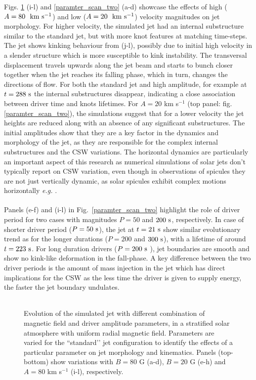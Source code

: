 \documentclass[12pt]{ociamthesis}
\newcommand{\fref}[1]{fig. \ref{#1}}
\newcommand{\kms}{~\rm{km ~s^{-1}}}
\newcommand{\np}{\\ \\}
\begin{document}
Figs. \ref{paramter_scan_one} (i-l) and \ref{paramter_scan_two} (a-d) showcase the effects of high ($A = 80 ~\kms$) and low ($A = 20 ~\kms$) velocity magnitudes on jet morphology. For higher velocity, the simulated jet had an internal substructure similar to the standard jet, but with more knot features at matching time-steps. The jet shows kinking behaviour from (j-l), possibly due to initial high velocity in a slender structure which is more susceptible to kink instability. The transversal displacement travels upwards along the jet beam and starts to bunch closer together when the jet reaches its falling phase, which in turn, changes the directions of flow. For both the standard jet and high amplitude, for example at $t = 288 ~\rm{s}$ the internal substructures disappear, indicating a close association between driver time and knots lifetimes. For $A = 20$ km s$^{-1}$ (top panel: \fref{paramter_scan_two}), the simulations suggest that for a lower velocity the jet heights are reduced along with an absence of any significant substructures. The initial amplitudes show that they are a key factor in the dynamics and morphology of the jet, as they are responsible for the complex internal substructures and the CSW variations. The horizontal dynamics are particularly an important aspect of this research as numerical simulations of solar jets don't typically report on CSW variation, even though in observations of spicules they are not just vertically dynamic, as solar spicules exhibit complex motions horizontally \textit{e.g.} \citep{Sharma2018ApJ85361S,Antolin2018ApJ85644A}. \np
%
Panels (e-f) and (i-l) in Fig.~\ref{paramter_scan_two} highlight the role of driver period for two cases with magnitudes $P = 50$ and $200~\rm{s}$, respectively. In case of shorter driver period ($P = 50 ~\rm{s}$), the jet at $t = 21~\rm{s}$ show similar evolutionary trend as for the longer durations ($P = 200$ and $300~\rm{s}$), with a lifetime of around $t = 223~\rm{s}$. For long duration drivers ($P = 200~\rm{s}$ ), jet boundaries are smooth and show no kink-like deformation in the fall-phase. A key difference between the two driver periods is the amount of mass injection in the jet which has direct implications for the CSW as the less time the driver is given to supply energy, the faster the jet boundary undulates. \np
\begin{figure}
\captionsetup[subfigure]{labelformat=empty}
\centering
{}
\caption{Evolution of the simulated jet with different combination of magnetic field and driver amplitude parameters, in a stratified solar atmosphere with uniform radial magnetic field. Parameters are varied for the ``standard’’ jet configuration to identify the effects of a particular parameter on jet morphology and kinematics. Panels (top-bottom) show variations with $B = 80$ G (a-d), $B = 20$ G  (e-h) and $A = 80$ km s$^{-1}$ (i-l), respectively.}
\label{paramter_scan_one}
\end{figure}
\end{document}
